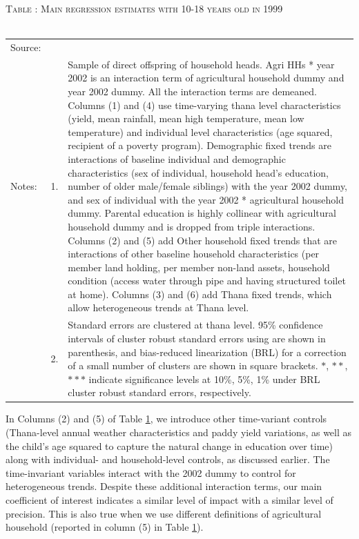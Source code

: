 \documentclass[12pt,letterpaper]{article}
\newcommand{\0}{\ensuremath{\mbox{\boldmath $0$}}}
\begin{document}
\begin{table}
\hfil\textsc{\footnotesize Table \thetable: Main regression estimates with 10-18 years old in 1999 \\
\label{base10}}\\
\setlength{\tabcolsep}{1pt}
\renewcommand{\arraystretch}{.75}
\hfil
\renewcommand{\arraystretch}{1}
\hfil\begin{tabular}{>{\hfill\scriptsize}p{1cm}<{}>{\hfill\scriptsize}p{.5cm}<{}>{\scriptsize}p{13cm}<{\hfill}}
Source:& \multicolumn{2}{l}{\scriptsize Compiled from IFPRI data. }\\[-1ex]
Notes:& 1. & Sample of direct offspring of household heads. \textsf{Agri HHs * year 2002} is an interaction term of agricultural household dummy and year 2002 dummy. All the interaction terms are demeaned. Columns \textsf{(1) and (4)} use time-varying thana level characteristics (yield, mean rainfall, mean high temperature, mean low temperature) and individual level characteristics (age squared, recipient of a poverty program). \textsf{Demographic fixed trends} are interactions of baseline individual and demographic characteristics (sex of individual, household head's education, number of older male/female siblings) with the year 2002 dummy, and sex of individual with the year 2002 * agricultural household dummy. Parental education is highly collinear with agricultural household dummy and is dropped from triple interactions. Columns \textsf{(2) and (5)} add \textsf{Other household fixed trends} that are interactions of other baseline household characteristics (per member land holding, per member non-land assets, household condition (access water through pipe and having structured toilet at home). Columns \textsf{(3) and (6)} add \textsf{Thana fixed trends}, which allow heterogeneous trends at Thana level. \\[-1ex]
& 2. & Standard errors are clustered at thana level. 95\% confidence intervals of cluster robust standard errors using \cite{liang1986longitudinal} are shown in parenthesis, and bias-reduced linearization (BRL) for a correction of a small number of clusters are shown in square brackets. $*$, $**$, $***$ indicate significance levels at 10\%, 5\%, 1\% under BRL cluster robust standard errors, respectively.
\end{tabular}
\end{table}

In Columns (2) and (5) of Table \ref{base10}, we introduce other time-variant controls (Thana-level annual weather characteristics and paddy yield variations, as well as the child's age squared to capture the natural change in education over time) along with individual- and household-level controls, as discussed earlier. The time-invariant variables interact with the 2002 dummy to control for heterogeneous trends. Despite these additional interaction terms, our main coefficient of interest indicates a similar level of impact with a similar level of precision. This is also true when we use different definitions of agricultural household (reported in column (5) in Table \ref{base10}).
\end{document}
